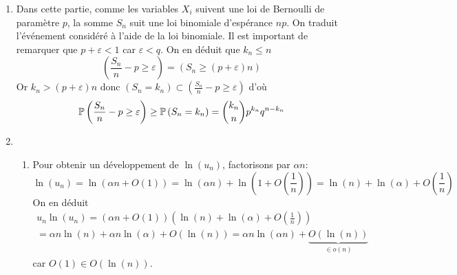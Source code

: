 \begin{enumerate}
 \item Dans cette partie, comme les variables $X_i$ suivent une loi de Bernoulli de paramètre $p$, la somme $S_n$ suit une loi binomiale d'espérance $np$. On traduit l'événement considéré à l'aide de la loi binomiale. Il est important de remarquer que $p+\varepsilon < 1$ car $\varepsilon < q$. On en déduit que $k_n \leq n$
\begin{displaymath}
 \left( \frac{S_n}{n}-p\geq \varepsilon\right) 
 = \left( S_n \geq (p+\varepsilon)n\right)
\end{displaymath}
Or $k_n > (p+\varepsilon)n$ donc $\left( S_n = k_n\right) \subset \left( \frac{S_n}{n}-p\geq \varepsilon\right)$ d'où
\begin{displaymath}
 \P\left( \frac{S_n}{n}-p\geq \varepsilon\right) \geq \P\left( S_n = k_n\right)
 =\binom{k_n}{n}p^{k_n} q^{n-k_n}
\end{displaymath}

\item 
\begin{enumerate}
 \item Pour obtenir un développement de $\ln(u_n)$, factorisons par $\alpha n$:
\begin{displaymath}
 \ln(u_n) = \ln(\alpha n + O(1)) = \ln(\alpha n) + \ln\left( 1 + O(\frac{1}{n})\right) 
 = \ln(n) + \ln(\alpha) + O(\frac{1}{n})
\end{displaymath}
On en déduit
\begin{multline*}
 u_n\ln(u_n) = \left( \alpha n + O(1)\right) \left( \ln(n) + \ln(\alpha) + O(\frac{1}{n})\right) \\
 = \alpha n \ln(n) + \alpha n \ln(\alpha) + O(\ln(n))
 = \alpha n \ln(\alpha n)  + \underset{\in o(n)}{\underbrace{O(\ln(n))}}
\end{multline*}
car $O(1) \in O(\ln(n))$.


\end{enumerate}
\end{enumerate}

